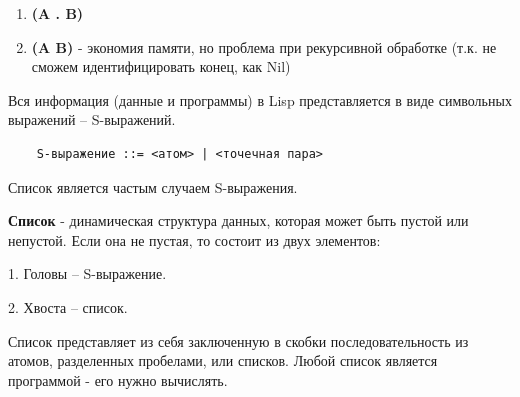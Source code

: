 \begin{enumerate}
	\item \textbf{(A . B)}
	\begin{figure}[ht!]
	\end{figure}
	\item \textbf{(A B)} - экономия памяти, но проблема при рекурсивной обработке (т.к. не сможем идентифицировать конец, как Nil)
	\begin{figure}[ht!]
	\end{figure}
\end{enumerate}

Вся информация (данные и программы) в Lisp представляется в виде символьных выражений -- S-выражений.
\begin{lstlisting}
	S-выражение ::= <атом> | <точечная пара>
\end{lstlisting}

Список является частым случаем S-выражения.



\textbf{Список} - динамическая структура данных, которая может быть пустой или непустой. Если она не пустая, то состоит из двух элементов:

1. Головы -- S-выражение.

2. Хвоста -- список.

Список представляет из себя заключенную в скобки
последовательность из атомов, разделенных пробелами, или списков.
Любой список является программой - его нужно вычислять.


